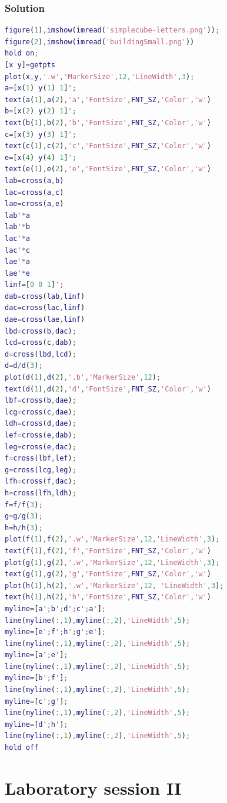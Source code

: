 \documentclass[12pt, a4paper]{report}
\begin{document}
    \subsection*{Solution}
        \begin{lstlisting}[language=Matlab]
figure(1),imshow(imread('simplecube-letters.png'));
figure(2),imshow(imread('buildingSmall.png'))
hold on;
[x y]=getpts
plot(x,y,'.w','MarkerSize',12,'LineWidth',3);
a=[x(1) y(1) 1]';
text(a(1),a(2),'a','FontSize',FNT_SZ,'Color','w')
b=[x(2) y(2) 1]';
text(b(1),b(2),'b','FontSize',FNT_SZ,'Color','w')
c=[x(3) y(3) 1]';
text(c(1),c(2),'c','FontSize',FNT_SZ,'Color','w')
e=[x(4) y(4) 1]';
text(e(1),e(2),'e','FontSize',FNT_SZ,'Color','w')
lab=cross(a,b)
lac=cross(a,c)
lae=cross(a,e)
lab'*a
lab'*b
lac'*a
lac'*c
lae'*a
lae'*e
linf=[0 0 1]';
dab=cross(lab,linf)
dac=cross(lac,linf)
dae=cross(lae,linf)
lbd=cross(b,dac);
lcd=cross(c,dab);
d=cross(lbd,lcd);
d=d/d(3);
plot(d(1),d(2),'.b','MarkerSize',12);
text(d(1),d(2),'d','FontSize',FNT_SZ,'Color','w')
lbf=cross(b,dae);
lcg=cross(c,dae);
ldh=cross(d,dae);
lef=cross(e,dab);
leg=cross(e,dac);
f=cross(lbf,lef);
g=cross(lcg,leg);
lfh=cross(f,dac);
h=cross(lfh,ldh);
f=f/f(3);
g=g/g(3);
h=h/h(3);
plot(f(1),f(2),'.w','MarkerSize',12,'LineWidth',3); 
text(f(1),f(2),'f','FontSize',FNT_SZ,'Color','w')
plot(g(1),g(2),'.w','MarkerSize',12,'LineWidth',3); 
text(g(1),g(2),'g','FontSize',FNT_SZ,'Color','w')
plot(h(1),h(2),'.w','MarkerSize',12, 'LineWidth',3);
text(h(1),h(2),'h','FontSize',FNT_SZ,'Color','w')
myline=[a';b';d';c';a'];
line(myline(:,1),myline(:,2),'LineWidth',5);
myline=[e';f';h';g';e'];
line(myline(:,1),myline(:,2),'LineWidth',5);
myline=[a';e'];
line(myline(:,1),myline(:,2),'LineWidth',5);
myline=[b';f'];
line(myline(:,1),myline(:,2),'LineWidth',5);
myline=[c';g'];
line(myline(:,1),myline(:,2),'LineWidth',5);
myline=[d';h'];
line(myline(:,1),myline(:,2),'LineWidth',5);
hold off
        \end{lstlisting}

\newpage

\chapter{Laboratory session II}
\end{document}
